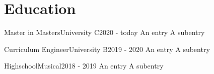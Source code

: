 
\section{Education}

\cvevent
{Master in Masters}{University C}{2020 - today}
{
    \entry An entry
    \subentry A subentry
}

\cvevent
{Curriculum Engineer}{University B}{2019 - 2020}
{
    \entry An entry
    \subentry A subentry
}

\cvevent
{Highschool}{Musical}{2018 - 2019}
{
    \entry An entry
    \subentry A subentry
}


